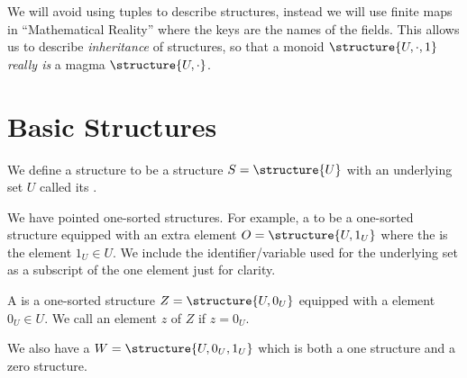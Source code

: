\begin{remark}
We will avoid using tuples to describe structures, instead we will use
finite maps in ``Mathematical Reality'' where the keys are the names
of the fields. This allows us to describe \emph{inheritance} of
structures, so that a monoid $\structure{U,\cdot,1}$ \emph{really is}
a magma $\structure{U,\cdot}$.
\end{remark}

\section{Basic Structures}

\begin{definition}
We define a  structure to be a structure
$S=\structure{U}$ with an underlying set $U$ called its .

We have pointed one-sorted structures. For example, a 
to be a one-sorted structure equipped with an extra element
$O=\structure{U,1_{U}}$ where the  is the element $1_{U}\in U$.
We include the identifier/variable used for the underlying set as a
subscript of the one element just for clarity.

A  is a one-sorted structure
$Z=\structure{U,0_{U}}$ equipped with a  element $0_{U}\in U$.
We call an element $z$ of $Z$  if $z=0_{U}$.

We also have a  $W=\structure{U,0_{U},1_{U}}$ which
is both a one structure and a zero structure.
\end{definition}

